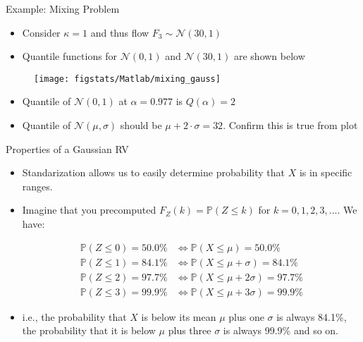 \documentclass[9pt]{beamer}
\begin{document}
\begin{frame}{Example: Mixing Problem}
\begin{itemize}
\item Consider $\kappa=1$ and thus flow $F_3\sim\mathcal{N}(30,1)$
\item Quantile functions for  $\mathcal{N}(0,1)$ and $\mathcal{N}(30,1)$ are shown below
\end{itemize}
\begin{figure}[!htb]
    \centering
	\texttt{[image: figstats/Matlab/mixing\_gauss]}
\end{figure}
\begin{itemize}
\item Quantile of $\mathcal{N}(0,1)$ at $\alpha=0.977$ is  $Q(\alpha)=2$
\item Quantile of  $\mathcal{N}(\mu,\sigma)$ should be $\mu+2\cdot \sigma=32$.  Confirm this is true from plot
\end{itemize}
\end{frame}

%
\begin{frame}{Properties of a Gaussian RV}

\begin{itemize}
\item Standarization allows us to easily determine probability that $X$ is in specific ranges.

\item Imagine that you precomputed $F_Z(k)=\mathbb{P}(Z\leq k)$ for $k=0,1,2,3,...$. We have:
\begin{block}{}
\begin{align*}
\mathbb{P}(Z\leq 0)=50.0\%&\Longleftrightarrow\mathbb{P}(X\leq \mu)=50.0\%\\
\mathbb{P}(Z\leq 1)=84.1\%&\Longleftrightarrow\mathbb{P}(X\leq \mu+\sigma)=84.1\%\\
\mathbb{P}(Z\leq 2)=97.7\%&\Longleftrightarrow\mathbb{P}(X\leq \mu+2\sigma)=97.7\%\\
\mathbb{P}(Z\leq 3)=99.9\%&\Longleftrightarrow\mathbb{P}(X\leq \mu+3\sigma)=99.9\%
\end{align*}
\end{block}
\item i.e., the probability that $X$ is below its mean $\mu$ plus one $\sigma$ is always 84.1\%, the probability that it is below $\mu$ plus three $\sigma$ is always 99.9\% and so on.  
\end{itemize} 

\end{frame}
\end{document}
